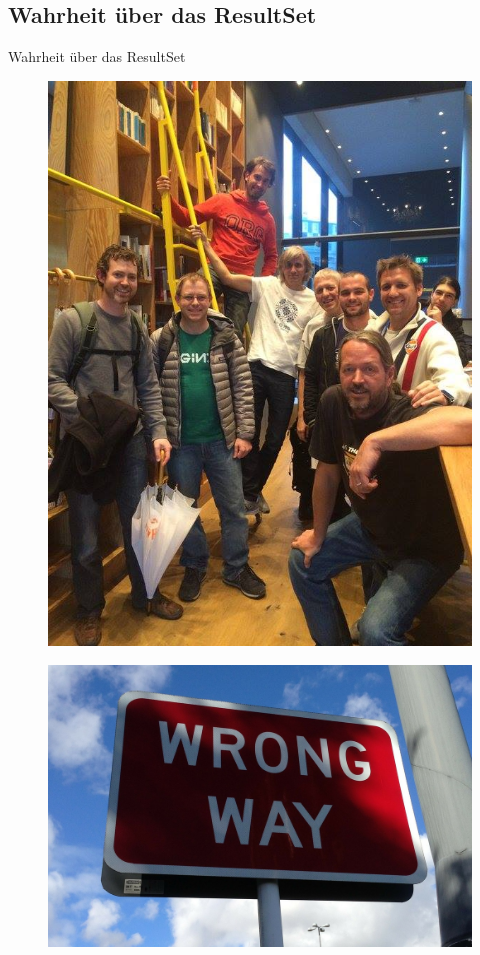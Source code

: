\subsection{Wahrheit über das ResultSet}

\begin{frame}{Wahrheit über das ResultSet}
\begin{figure}[!ht]
\centering
\includegraphics[width=0.5\linewidth]{img/pdc_users.jpg}
\end{figure}
\end{frame}


\begin{frame}{}
\begin{figure}[!ht]
\centering
\includegraphics[width=1\linewidth]{img/wrong-way.jpg}
\end{figure}
\end{frame}

